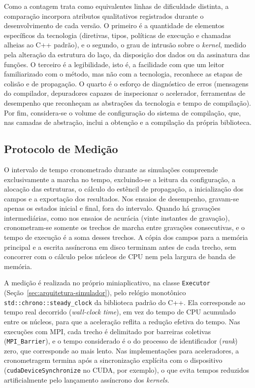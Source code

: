 Como a contagem trata como equivalentes linhas de dificuldade distinta, a comparação incorpora atributos qualitativos registrados durante o desenvolvimento de cada versão.
O primeiro é a quantidade de elementos específicos da tecnologia (diretivas, tipos, políticas de execução e chamadas alheias ao C++ padrão), e o segundo, o grau de intrusão sobre o \textit{kernel}, medido pela alteração da estrutura do laço, da disposição dos dados ou da assinatura das funções.
O terceiro é a legibilidade, isto é, a facilidade com que um leitor familiarizado com o método, mas não com a tecnologia, reconhece as etapas de colisão e de propagação.
O quarto é o esforço de diagnóstico de erros (mensagens do compilador, depuradores capazes de inspecionar o acelerador, ferramentas de desempenho que reconheçam as abstrações da tecnologia e tempo de compilação).
Por fim, considera-se o volume de configuração do sistema de compilação, que, nas camadas de abstração, inclui a obtenção e a compilação da própria biblioteca.


\subsection{Protocolo de Medição}\label{subsec:protocolo-de-medicao}

O intervalo de tempo cronometrado durante as simulações compreende exclusivamente a marcha no tempo, excluindo-se a leitura da configuração, a alocação das estruturas, o cálculo do estêncil de propagação, a inicialização dos campos e a exportação dos resultados.
Nos ensaios de desempenho, gravam-se apenas os estados inicial e final, fora do intervalo.
Quando há gravações intermediárias, como nos ensaios de acurácia (vinte instantes de gravação), cronometram-se somente os trechos de marcha entre gravações consecutivas, e o tempo de execução é a soma desses trechos.
A cópia dos campos para a memória principal e a escrita assíncrona em disco terminam antes de cada trecho, sem concorrer com o cálculo pelos núcleos de CPU nem pela largura de banda de memória.

A medição é realizada no próprio miniaplicativo, na classe \texttt{Executor} (Seção~\ref{sec:arquitetura-simulador}), pelo relógio monotônico \texttt{std::chrono::steady\_clock} da biblioteca padrão do C++.
Ela corresponde ao tempo real decorrido (\textit{wall-clock time}), em vez do tempo de CPU acumulado entre os núcleos, para que a aceleração reflita a redução efetiva do tempo.
Nas execuções com MPI, cada trecho é delimitado por barreiras coletivas (\texttt{MPI\_Barrier}), e o tempo considerado é o do processo de identificador (\textit{rank}) zero, que corresponde ao mais lento.
Nas implementações para aceleradores, a cronometragem termina após a sincronização explícita com o dispositivo (\texttt{cudaDeviceSynchronize} no CUDA, por exemplo), o que evita tempos reduzidos artificialmente pelo lançamento assíncrono dos \textit{kernels}.

